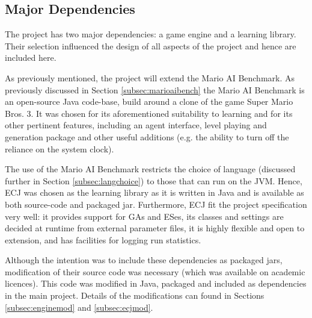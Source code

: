 \subsection{Major Dependencies}
The project has two major dependencies: a game engine and a learning library. Their selection influenced the design of all aspects of the project and hence are included here. 

As previously mentioned, the project will extend the Mario AI Benchmark. As previously discussed in Section \ref{subsec:marioaibench} the Mario AI Benchmark is an open-source Java code-base, build around a clone of the game Super Mario Bros. 3. It was chosen for its aforementioned suitability to learning and for its other pertinent features, including an agent interface, level playing and generation package and other useful additions (e.g. the ability to turn off the reliance on the system clock).

The use of the Mario AI Benchmark restricts the choice of language (discussed further in Section \ref{subsec:langchoice}) to those that can run on the JVM. Hence, ECJ was chosen as the learning library as it is written in Java and is available as both source-code and packaged jar. Furthermore, ECJ fit the project specification very well: it provides support for GAs and ESes, its classes and settings are decided at runtime from external parameter files, it is highly flexible and open to extension, and has facilities for logging run statistics.

Although the intention was to include these dependencies as packaged jars, modification of their source code was necessary (which was available on academic licences). This code was modified in Java, packaged and included as dependencies in the main project. Details of the modifications can found in Sections \ref{subsec:enginemod} and \ref{subsec:ecjmod}.